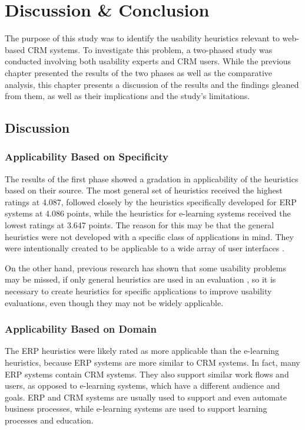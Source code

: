\chapter{Discussion \& Conclusion}
\label{chap:discussion}
The purpose of this study was to identify the usability heuristics relevant to web-based CRM systems. To investigate this problem, a two-phased study was conducted involving both usability experts and CRM users. While the previous chapter presented the results of the two phases as well as the comparative analysis, this chapter presents a discussion of the results and the findings gleaned from them, as well as their implications and the study's limitations.

\section{Discussion}
\subsection{Applicability Based on Specificity}
The results of the first phase showed a gradation in applicability of the heuristics based on their source. The most general set of heuristics \citep{Nielsen1994a} received the highest ratings at 4.087, followed closely by the heuristics specifically developed for ERP systems \citep{Singh2009} at 4.086 points, while the heuristics for e-learning systems \citep{Ardito2006} received the lowest ratings at 3.647 points. The reason for this may be that the general heuristics were not developed with a specific class of applications in mind. They were intentionally created to be applicable to a wide array of user interfaces \citep[p.\ 28]{Nielsen1994a}.

On the other hand, previous research has shown that some usability problems may be missed, if only general heuristics are used in an evaluation \citep[e.g.][]{Rusu2011}, so it is necessary to create heuristics for specific applications to improve usability evaluations, even though they may not be widely applicable.

\subsection{Applicability Based on Domain}
The ERP heuristics were likely rated as more applicable than the e-learning heuristics, because ERP systems are more similar to CRM systems. In fact, many ERP systems contain CRM systems. They also support similar work flows and users, as opposed to e-learning systems, which have a different audience and goals. ERP and CRM systems are usually used to support and even automate business processes, while e-learning systems are used to support learning processes and education.

